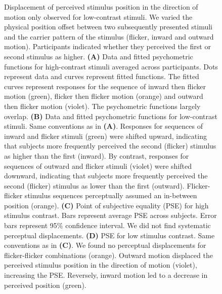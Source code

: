 \begin{figure}[htb!]
\ContinuedFloat
\captionsetup{labelformat=adja-page}
\caption{Displacement of perceived stimulus position in the direction of motion only observed for low-contrast stimuli. We varied the physical position offset between two subsequently presented stimuli and the carrier pattern of the stimulus (flicker, inward and outward motion). Participants indicated whether they perceived the first or second stimulus as higher. \textbf{(A)} Data and fitted psychometric functions for high-contrast stimuli averaged across participants. Dots represent data and curves represent fitted functions. The fitted curves represent responses for the sequence of inward then flicker motion (green), flicker then flicker motion (orange) and outward then flicker motion (violet). The psychometric functions largely overlap. \textbf{(B)} Data and fitted psychometric functions for low-contrast stimuli. Same conventions as in \textbf{(A)}. Responses for sequences of inward and flicker stimuli (green) were shifted upward, indicating that subjects more frequently perceived the second (flicker) stimulus as higher than the first (inward). By contrast, responses for  sequences of outward and flicker stimuli (violet) were shifted downward, indicating that subjects more frequently perceived the second (flicker) stimulus as lower than the first (outward). Flicker-flicker stimulus sequences perceptually assumed an in-between position (orange). \textbf{(C)} Point of subjective equality (PSE) for high stimulus contrast. Bars represent average PSE across subjects. Error bars represent 95\% confidence interval. We did not find systematic perceptual displacements. \textbf{(D)} PSE for low stimulus contrast. Same conventions as in \textbf{(C)}. We found no perceptual displacements for flicker-flicker combinations (orange). Outward motion displaced the perceived stimulus position in the direction of motion (violet), increasing the PSE. Reversely, inward motion led to a decrease in perceived position (green).}
\label{fig:psyphy}
\noindent\hrulefill
\end{figure}

